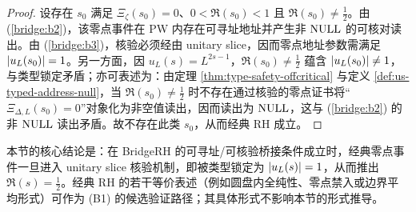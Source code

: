 \begin{proof}
设存在 $s_0$ 满足 $\Xi_\zeta(s_0)=0$、$0<\Re(s_0)<1$ 且 $\Re(s_0)\neq \tfrac12$。由 (\ref{bridge:b2})，该零点事件在 PW 内存在可寻址地址并产生非 $\mathrm{NULL}$ 的可核对读出。由 (\ref{bridge:b3})，核验必须经由 unitary slice，因而零点地址参数需满足 $\left\lvert u_L(s_0)\right\rvert=1$。另一方面，因 $u_L(s)=L^{2s-1}$，$\Re(s_0)\neq\tfrac12$ 蕴含 $\left\lvert u_L(s_0)\right\rvert\neq 1$，与类型锁定矛盾；亦可表述为：由定理 \ref{thm:type-safety-offcritical} 与定义 \ref{def:us-typed-address-null}，当 $\Re(s_0)\neq\tfrac12$ 时不存在通过核验的零点证书将“$\Xi_{\Delta,L}(s_0)=0$”对象化为非空值读出，因而读出为 $\mathrm{NULL}$，这与 (\ref{bridge:b2}) 的非 $\mathrm{NULL}$ 读出矛盾。故不存在此类 $s_0$，从而经典 RH 成立。
\end{proof}

\begin{remark}[关于经典侧等价判据]
本节的核心结论是：在 BridgeRH 的可寻址/可核验桥接条件成立时，经典零点事件一旦进入 unitary slice 核验机制，即被类型锁定为 $\left\lvert u_L(s)\right\rvert=1$，从而推出 $\Re(s)=\tfrac12$。经典 RH 的若干等价表述（例如圆盘内全纯性、零点禁入或边界平均形式）可作为 (B1) 的候选验证路径；其具体形式不影响本节的形式推导。
\end{remark}

